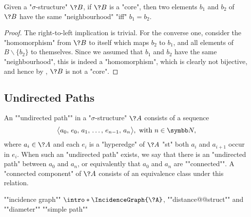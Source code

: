\begin{proposition}
	\AP\label{prop:neighbourhood-core}
	Given a "$\sigma$-structure" $\?B$, if $\?B$ is a "core", then
	two elements $b_1$ and $b_2$ of $\?B$ have the same "neighbourhood" "iff" $b_1 = b_2$.
\end{proposition}

\begin{proof}
	The right-to-left implication is trivial.
	For the converse one, consider the "homomorphism" from $\?B$ to itself
	which maps $b_2$ to $b_1$, and all elements of $B \smallsetminus \{b_2\}$
	to themselves. Since we assumed that $b_1$ and $b_2$ have the same "neighbourhood",
	this is indeed a "homomorphism", which is clearly not bijective, and
	hence by , $\?B$ is not a "core".
\end{proof}

\subsection{Undirected Paths}

An \AP""undirected path"" in a "$\sigma$-structure" $\?A$ consists of a sequence
\[\big\langle a_0,\, e_0,\, a_1,\, \hdots,\, e_{n-1},\, a_n\big\rangle, \text{ with } n \in \N,\]
where $a_i \in \?A$ and each $e_i$ is a "hyperedge" of $\?A$ "st" both
$a_i$ and $a_{i+1}$ occur in $e_i$. When such an "undirected path" exists, we say that
there is an "undirected path" between $a_0$ and $a_n$, or equivalently
that $a_0$ and $a_n$ are \AP""connected"".%
A \AP"connected component" of $\?A$ consists of an equivalence class under this relation.

\begin{itemize}
	\itemAP ""incidence graph"" $\intro*\IncidenceGraph{\?A}$, ""distance@@struct"" and ""diameter""
	\itemAP ""simple path""
\end{itemize}